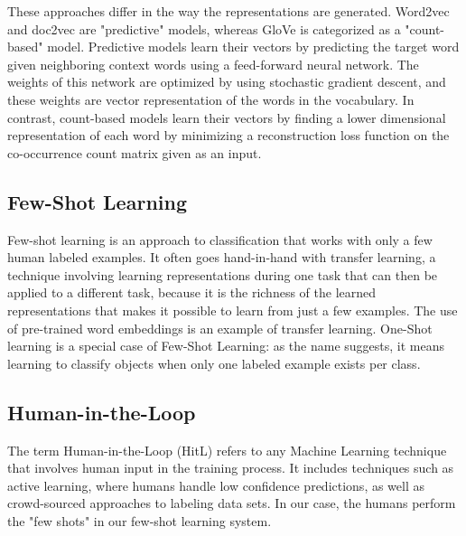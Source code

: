\documentclass{article} %
\begin{document}
These approaches differ in the way the representations are generated.  Word2vec and doc2vec are "predictive" models, whereas GloVe is categorized as a "count-based" model.  Predictive models learn their vectors by predicting the target word given neighboring context words using a feed-forward neural network. The weights of this network are optimized by using stochastic gradient descent, and these weights are vector representation of the words in the vocabulary. In contrast, count-based models learn their vectors by finding a lower dimensional representation of each word by minimizing a reconstruction loss function on the co-occurrence count matrix given as an input.

\subsection*{Few-Shot Learning}
Few-shot learning is an approach to classification that works with only a few human labeled examples. It often goes hand-in-hand with transfer learning, a technique involving learning representations during one task that can then be applied to a different task, because it is the richness of the learned representations that makes it possible to learn from just a few examples. The use of pre-trained word embeddings is an example of transfer learning. One-Shot learning is a special case of Few-Shot Learning: as the name suggests, it means learning to classify objects when only one labeled example exists per class.

\subsection*{Human-in-the-Loop}
The term Human-in-the-Loop (HitL) refers to any Machine Learning technique that involves human input in the training process. It includes techniques such as active learning, where humans handle low confidence predictions, as well as crowd-sourced approaches to labeling data sets. In our case, the humans perform the "few shots" in our few-shot learning system.
\end{document}
